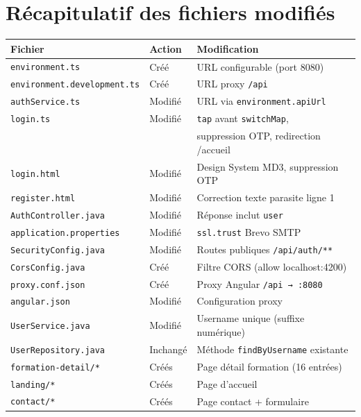 \documentclass[a4paper,12pt,french]{article}
\begin{document}
\newpage

\section{Récapitulatif des fichiers modifiés}

\begin{center}
\begin{tabular}{|l|l|p{4.5cm}|}
\hline
\textbf{Fichier} & \textbf{Action} & \textbf{Modification} \\
\hline
\texttt{environment.ts} & Créé & URL configurable (port 8080) \\
\texttt{environment.development.ts} & Créé & URL proxy \texttt{/api} \\
\texttt{authService.ts} & Modifié & URL via \texttt{environment.apiUrl} \\
\texttt{login.ts} & Modifié & \texttt{tap} avant \texttt{switchMap}, \\
& & suppression OTP, redirection /accueil \\
\texttt{login.html} & Modifié & Design System MD3, suppression OTP \\
\texttt{register.html} & Modifié & Correction texte parasite ligne 1 \\
\texttt{AuthController.java} & Modifié & Réponse inclut \texttt{user} \\
\texttt{application.properties} & Modifié & \texttt{ssl.trust} Brevo SMTP \\
\texttt{SecurityConfig.java} & Modifié & Routes publiques \texttt{/api/auth/**} \\
\texttt{CorsConfig.java} & Créé & Filtre CORS (allow localhost:4200) \\
\texttt{proxy.conf.json} & Créé & Proxy Angular \texttt{/api → :8080} \\
\texttt{angular.json} & Modifié & Configuration proxy \\
\texttt{UserService.java} & Modifié & Username unique (suffixe numérique) \\
\texttt{UserRepository.java} & Inchangé & Méthode \texttt{findByUsername} existante \\
\texttt{formation-detail/*} & Créés & Page détail formation (16 entrées) \\
\texttt{landing/*} & Créés & Page d'accueil \\
\texttt{contact/*} & Créés & Page contact + formulaire \\

\end{tabular}
\end{center}
\end{document}
